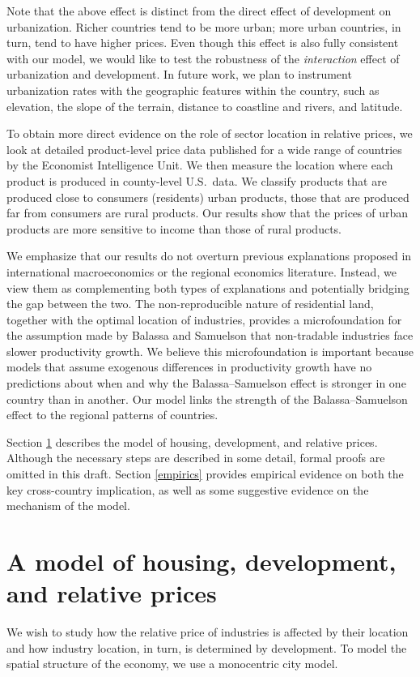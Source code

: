 \documentclass[12pt]{article}
\begin{document}
Note  that the above effect is distinct from the direct effect of development on urbanization. Richer countries tend to be more urban; more urban countries, in turn, tend to have higher prices. Even though this effect is also fully consistent with our model, we would like to test the robustness of the \emph{interaction} effect of urbanization and development. In future work, we plan to instrument urbanization rates with the geographic features within the country, such as elevation, the slope of the terrain, distance to coastline and rivers, and latitude.

To obtain more direct evidence on the role of sector location in relative prices, we look at detailed product-level price data published for a wide range of countries by the Economist Intelligence Unit. We then measure the location where each product is produced in county-level U.S.~data. We classify products that are produced close to consumers (residents) urban products, those that are produced far from consumers are rural products. Our results show that the prices of urban products are more sensitive to income than those of rural products. 

We emphasize that our results do not overturn previous explanations proposed in international macroeconomics or the regional economics literature. Instead, we view them as complementing both types of explanations and potentially bridging the gap between the two. The non-reproducible nature of residential land, together with the optimal location of industries, provides a microfoundation for the {assumption} made by Balassa and Samuelson that non-tradable industries face slower productivity growth. We believe this microfoundation is important because models that assume exogenous differences in productivity growth have no predictions about when and why the Balassa--Samuelson effect is stronger in one country than in another. Our model links the strength of the Balassa--Samuelson effect to the regional patterns of countries.

Section \ref{model} describes the model of housing, development, and relative prices. Although the necessary steps are described in some detail, formal proofs are omitted in this draft. Section \ref{empirics} provides empirical evidence on both the key cross-country implication, as well as some suggestive evidence on the mechanism of the model.

\section{A model of housing, development, and relative prices}\label{model}
We wish to study how the relative price of industries is affected by their location and how industry location, in turn, is determined by development. To model the spatial structure of the economy, we use a monocentric city model.
\end{document}
